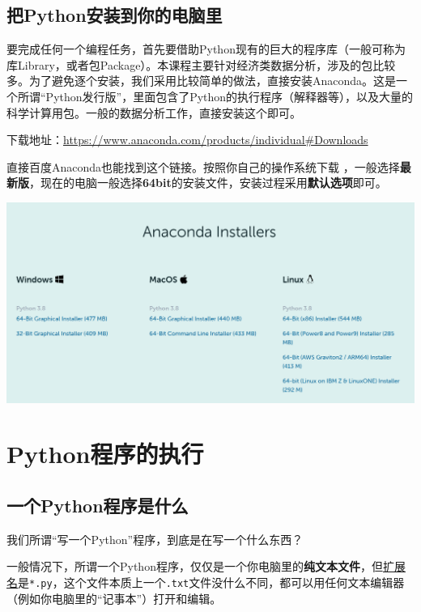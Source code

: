 \documentclass[
]{book}
\begin{document}
\hypertarget{ux628apythonux5b89ux88c5ux5230ux4f60ux7684ux7535ux8111ux91cc}{%
\section{把Python安装到你的电脑里}\label{ux628apythonux5b89ux88c5ux5230ux4f60ux7684ux7535ux8111ux91cc}}

要完成任何一个编程任务，首先要借助Python现有的巨大的程序库（一般可称为库Library，或者包Package）。本课程主要针对经济类数据分析，涉及的包比较多。为了避免逐个安装，我们采用比较简单的做法，直接安装Anaconda。这是一个所谓``Python发行版''，里面包含了Python的执行程序（解释器等），以及大量的科学计算用包。一般的数据分析工作，直接安装这个即可。

下载地址：\url{https://www.anaconda.com/products/individual\#Downloads}

直接百度Anaconda也能找到这个链接。按照你自己的操作系统下载 ，一般选择\textbf{最新版}，现在的电脑一般选择\textbf{64bit}的安装文件，安装过程采用\textbf{默认选项}即可。

\includegraphics{images/anaconda_download.png}

\hypertarget{pythonux7a0bux5e8fux7684ux6267ux884c}{%
\chapter{Python程序的执行}\label{pythonux7a0bux5e8fux7684ux6267ux884c}}

\hypertarget{ux4e00ux4e2apythonux7a0bux5e8fux662fux4ec0ux4e48}{%
\section{一个Python程序是什么}\label{ux4e00ux4e2apythonux7a0bux5e8fux662fux4ec0ux4e48}}

我们所谓``写一个Python''程序，到底是在写一个什么东西？

一般情况下，所谓一个Python程序，仅仅是一个你电脑里的\textbf{纯文本文件}，但\protect\hyperlink{ext_name}{扩展名}是\texttt{*.py}，这个文件本质上一个\texttt{.txt}文件没什么不同，都可以用任何文本编辑器（例如你电脑里的``记事本''）打开和编辑。
\end{document}
